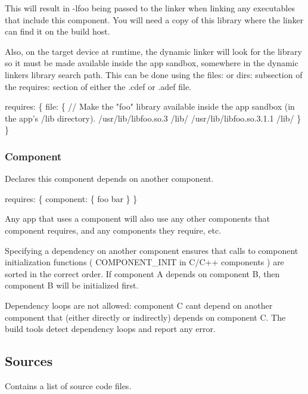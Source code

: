 This will result in {\ttfamily -\/lfoo} being passed to the linker when linking any executables that include this component. You will need a copy of this library where the linker can find it on the build host.

Also, on the target device at runtime, the dynamic linker will look for the library so it must be made available inside the app sandbox, somewhere in the dynamic linker\textquotesingle{}s library search path. This can be done using the {\ttfamily files\+:} or {\ttfamily dirs\+:} subsection of the {\ttfamily requires\+:} section of either the {\ttfamily .cdef} or {\ttfamily .adef} file.


\begin{DoxyCode}
requires:
\{
    file:
    \{
        \textcolor{comment}{// Make the "foo" library available inside the app sandbox (in the app's /lib directory).}
        /usr/lib/libfoo.so.3     /lib/
        /usr/lib/libfoo.so.3.1.1 /lib/
    \}
\}
\end{DoxyCode}
\hypertarget{def_files_cdef_defFilesCdef_requiresComponent}{}\subsubsection{Component}\label{def_files_cdef_defFilesCdef_requiresComponent}
Declares this component depends on another component.


\begin{DoxyCode}
requires:
\{
    component:
    \{
        foo
        bar
    \}
\}
\end{DoxyCode}


Any app that uses a component will also use any other components that component requires, and any components they require, etc.

Specifying a dependency on another component ensures that calls to component initialization functions ( {\ttfamily C\+O\+M\+P\+O\+N\+E\+N\+T\+\_\+\+I\+N\+I\+T} in C/\+C++ components ) are sorted in the correct order. If component A depends on component B, then component B will be initialized first.

Dependency loops are not allowed\+: component C can\textquotesingle{}t depend on another component that (either directly or indirectly) depends on component C. The build tools detect dependency loops and report any error.\hypertarget{def_files_cdef_defFilesCdef_sources}{}\subsection{Sources}\label{def_files_cdef_defFilesCdef_sources}
Contains a list of source code files.

